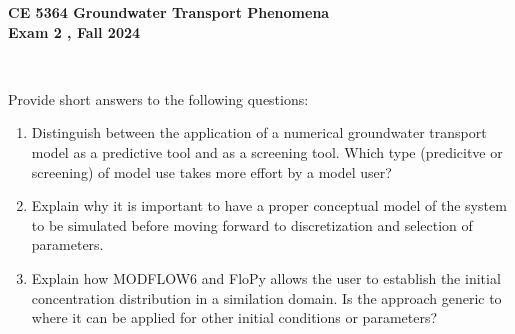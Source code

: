 \documentclass[12pt]{article}
\begin{document}
\begingroup
\begin{centering}
\textbf{CE 5364 Groundwater Transport Phenomena } \\
\textbf{Exam 2 , Fall 2024}\\
\end{centering}
~\\
\endgroup

Provide short answers to the following questions:
\begin{enumerate}

\item Distinguish between the application of a numerical groundwater transport model as a predictive tool and as a screening tool.  Which type (predicitve or screening) of model use takes more effort by a model user?

\item Explain why it is important to have a proper conceptual model of the system to be simulated before moving forward to discretization and selection of parameters.
\item  Explain how MODFLOW6 and FloPy allows the user to establish the initial concentration distribution in a similation domain.  Is the approach generic to where it can be applied for other initial conditions or parameters?


\end{enumerate}
\end{document}
